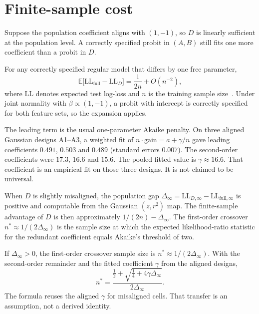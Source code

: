 \section{Finite-sample cost}
\label{sec:finite_sample}

Suppose the population coefficient aligns with $(1,-1)$, so $D$ is linearly sufficient at the population level.
A correctly specified probit in $(A,B)$ still fits one more coefficient than a probit in $D$.

\begin{proposition}
\label{prop:gain}
For any correctly specified regular model that differs by one free parameter,
\[
  \mathbb{E}\bigl[\mathrm{LL}_{\mathrm{full}}-\mathrm{LL}_D\bigr]
  = \frac{1}{2n}+O(n^{-2}),
\]
where $\mathrm{LL}$ denotes expected test log-loss and $n$ is the training sample size~\parencite{akaike1973,stone1977}.
Under joint normality with $\beta\propto(1,-1)$, a probit with intercept is correctly specified for both feature sets, so the expansion applies.
\end{proposition}

The leading term is the usual one-parameter Akaike penalty.
On three aligned Gaussian designs A1--A3, a weighted fit of $n\cdot\mathrm{gain}=a+\gamma/n$ gave leading coefficients $0.491$, $0.503$ and $0.489$ (standard errors $0.007$).
The second-order coefficients were $17.3$, $16.6$ and $15.6$.
The pooled fitted value is $\gamma\approx 16.6$.
That coefficient is an empirical fit on those three designs.
It is not claimed to be universal.

When $D$ is slightly misaligned, the population gap $\Delta_\infty=\mathrm{LL}_{D,\infty}-\mathrm{LL}_{\mathrm{full},\infty}$ is positive and computable from the Gaussian $(z,r^2)$ map.
The finite-sample advantage of $D$ is then approximately $1/(2n)-\Delta_\infty$.
The first-order crossover $n^*\approx 1/(2\Delta_\infty)$ is the sample size at which the expected likelihood-ratio statistic for the redundant coefficient equals Akaike's threshold of two.

\begin{remark}
\label{rem:crossover}
If $\Delta_\infty>0$, the first-order crossover sample size is $n^*\approx 1/(2\Delta_\infty)$.
With the second-order remainder and the fitted coefficient $\gamma$ from the aligned designs,
\[
  n^*
  = \frac{\tfrac12+\sqrt{\tfrac14+4\gamma\Delta_\infty}}{2\Delta_\infty}.
\]
The formula reuses the aligned $\gamma$ for misaligned cells.
That transfer is an assumption, not a derived identity.
\end{remark}

